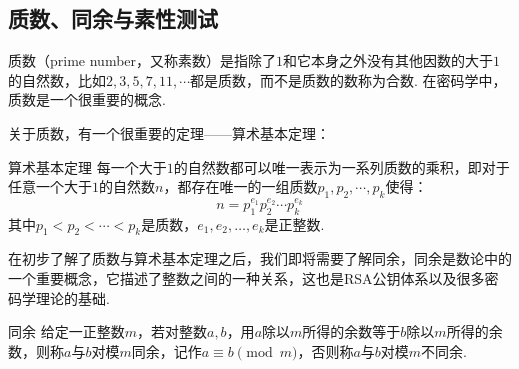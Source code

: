 \documentclass{book}
\numberwithin{equation}{subsubsection}
\begin{document}
\subsection{质数、同余与素性测试}
质数（prime number，又称素数）是指除了$1$和它本身之外没有其他因数的大于$1$的自然数，比如$2,3,5,7,11,\cdots$都是质数，而不是质数的数称为合数.
在密码学中，质数是一个很重要的概念.\par
关于质数，有一个很重要的定理——算术基本定理：

\begin{concept}{算术基本定理}
每一个大于$1$的自然数都可以唯一表示为一系列质数的乘积，即对于任意一个大于$1$的自然数$n$，都存在唯一的一组质数$p_1,p_2,\cdots,p_k$使得：
\begin{equation}
    n=p_1^{e_1}p_2^{e_2}\cdots p_k^{e_k}
    \nonumber
\end{equation}
其中$p_1<p_2<\cdots<p_k$是质数，$e_1,e_2,\ldots,e_k$是正整数.\par
\end{concept}

在初步了解了质数与算术基本定理之后，我们即将需要了解同余，同余是数论中的一个重要概念，它描述了整数之间的一种关系，这也是RSA公钥体系以及很多密码学理论的基础.\par

\begin{concept}{同余}
给定一正整数$m$，若对整数$a,b$，用$a$除以$m$所得的余数等于$b$除以$m$所得的余数，则称$a$与$b$对模$m$同余，记作$a\equiv b\pmod{m}$，否则称$a$与$b$对模$m$不同余.\par
\end{concept}
\end{document}
